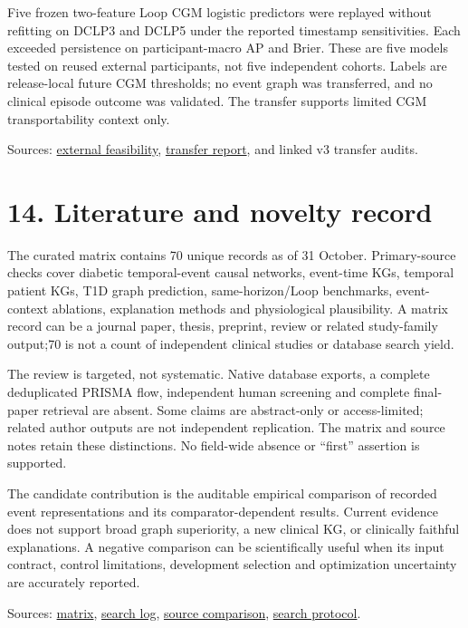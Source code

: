 \documentclass[11pt,a4paper]{article}
\begin{document}
Five frozen two-feature Loop CGM logistic predictors were replayed without refitting on DCLP3 and DCLP5 under the reported timestamp sensitivities. Each exceeded persistence on participant-macro AP and Brier. These are five models tested on reused external participants, not five independent cohorts. Labels are release-local future CGM thresholds; no event graph was transferred, and no clinical episode outcome was validated. The transfer supports limited CGM transportability context only.

Sources: \href{dclp_temporal_coverage_audit_2026_10_31.md}{external feasibility}, \href{frozen_loop_cgm_jaeb_transfer_20261031.md}{transfer report}, and linked v3 transfer audits.

\section*{14. Literature and novelty record}
The curated matrix contains 70 unique records as of 31 October. Primary-source checks cover diabetic temporal-event causal networks, event-time KGs, temporal patient KGs, T1D graph prediction, same-horizon/Loop benchmarks, event-context ablations, explanation methods and physiological plausibility. A matrix record can be a journal paper, thesis, preprint, review or related study-family output;70 is not a count of independent clinical studies or database search yield.

The review is targeted, not systematic. Native database exports, a complete deduplicated PRISMA flow, independent human screening and complete final-paper retrieval are absent. Some claims are abstract-only or access-limited; related author outputs are not independent replication. The matrix and source notes retain these distinctions. No field-wide absence or “first” assertion is supported.

The candidate contribution is the auditable empirical comparison of recorded event representations and its comparator-dependent results. Current evidence does not support broad graph superiority, a new clinical KG, or clinically faithful explanations. A negative comparison can be scientifically useful when its input contract, control limitations, development selection and optimization uncertainty are accurately reported.

Sources: \href{literature_matrix.csv}{matrix}, \href{literature_search_log.md}{search log}, \href{targeted_prior_art_search_2026_10_31.md}{source comparison}, \href{pubmed_search_protocol_2026_10_31.md}{search protocol}.
\end{document}
